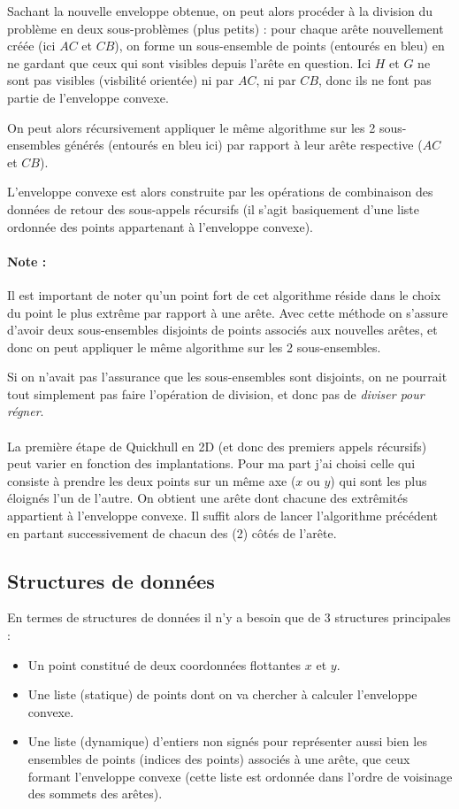 \documentclass[]{article}
\begin{document}
Sachant la nouvelle enveloppe obtenue, on peut alors procéder à la division du problème en deux sous-problèmes (plus petits) : pour chaque arête nouvellement créée (ici $AC$ et $CB$), on forme un sous-ensemble de points (entourés en bleu) en ne gardant que ceux qui sont visibles depuis l'arête en question. Ici $H$ et $G$ ne sont pas visibles (visbilité orientée) ni par $AC$, ni par $CB$, donc ils ne font pas partie de l'enveloppe convexe.

On peut alors récursivement appliquer le même algorithme sur les 2 sous-ensembles générés (entourés en bleu ici) par rapport à leur arête respective ($AC$ et $CB$).

L'enveloppe convexe est alors construite par les opérations de combinaison des données de retour des sous-appels récursifs (il s'agit basiquement d'une liste ordonnée des points appartenant à l'enveloppe convexe).

\paragraph{Note :}
Il est important de noter qu'un point fort de cet algorithme réside dans le choix du point le plus extrême par rapport à une arête. Avec cette méthode on s'assure d'avoir deux sous-ensembles disjoints de points associés aux nouvelles arêtes, et donc on peut appliquer le même algorithme sur les 2 sous-ensembles.

Si on n'avait pas l'assurance que les sous-ensembles sont disjoints, on ne pourrait tout simplement pas faire l'opération de division, et donc pas de \emph{diviser pour régner}.

\paragraph{}
La première étape de Quickhull en 2D (et donc des premiers appels récursifs) peut varier en fonction des implantations. Pour ma part j'ai choisi celle qui consiste à prendre les deux points sur un même axe ($x$ ou $y$) qui sont les plus éloignés l'un de l'autre. On obtient une arête dont chacune des extrêmités appartient à l'enveloppe convexe. Il suffit alors de lancer l'algorithme précédent en partant successivement de chacun des (2) côtés de l'arête.

\subsection{Structures de données}
En termes de structures de données il n'y a besoin que de 3 structures principales :
\begin{itemize}
	\item Un point constitué de deux coordonnées flottantes $x$ et $y$.
	\item Une liste (statique) de points dont on va chercher à calculer l'enveloppe convexe.
	\item Une liste (dynamique) d'entiers non signés pour représenter aussi bien les ensembles de points (indices des points) associés à une arête, que ceux formant l'enveloppe convexe (cette liste est ordonnée dans l'ordre de voisinage des sommets des arêtes).
\end{itemize}
\end{document}
